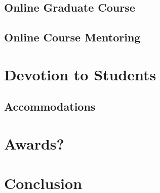 \documentclass[10pt]{article}
\begin{document}
\subsection{Online Graduate Course}

\subsection{Online Course Mentoring}

\section{Devotion to Students}


\subsection{Accommodations}


\section{Awards?}


\section{Conclusion}
\end{document}
